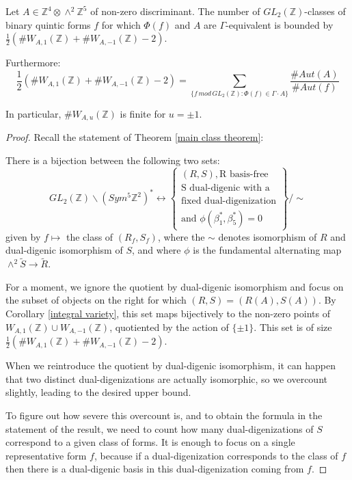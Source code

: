 \documentclass{report}
\begin{document}
\begin{corollary} \label{class count}
Let $A \in \mathbb{Z}^4 \otimes \wedge^2 \mathbb{Z}^5$ of non-zero discriminant.  The number of $GL_2(\mathbb{Z})$-classes of binary quintic forms $f$ for which $\Phi(f)$ and $A$ are $\Gamma$-equivalent is bounded by $\frac{1}{2}(\# W_{A,1}(\mathbb{Z}) + \# W_{A,-1}(\mathbb{Z}) - 2)$.

Furthermore:
\begin{equation}
\frac{1}{2}(\# W_{A,1}(\mathbb{Z}) + \# W_{A,-1}(\mathbb{Z}) - 2) = \sum_{\{f \, mod \, GL_2(\mathbb{Z}) : \Phi(f) \in \Gamma \cdot A \} } \frac{\#Aut(A)}{\#Aut(f)}
\end{equation}

In particular, $\# W_{A,u}(\mathbb{Z})$ is finite for $u = \pm 1$.
\end{corollary}
\begin{proof}
Recall the statement of Theorem \ref{main class theorem}:

There is a bijection between the following two sets:
\begin{equation}
GL_2(\mathbb{Z}) \backslash (Sym^5 \mathbb{Z}^2)^* \leftrightarrow
\left \{
\begin{array}{l}
(R,S), \text{R basis-free} \\
\text{S dual-digenic with a} \\
\text{fixed dual-digenization} \\
\text{and } \phi(\beta_1^*,\beta_5^*) = 0 
\end{array}
\right \}
 / \sim
\end{equation}
given by $f \mapsto$ the class of $(R_f, S_f)$, where the $\sim$ denotes isomorphism of $R$ and dual-digenic isomorphism of $S$, and where $\phi$ is the fundamental alternating map $\wedge^2 \tilde{S} \to \tilde{R}$.

For a moment, we ignore the quotient by dual-digenic isomorphism and focus on the subset of objects on the right for which $(R,S) = (R(A),S(A))$.  By Corollary \ref{integral variety}, this set maps bijectively to the non-zero points of $W_{A,1}(\mathbb{Z}) \cup W_{A,-1}(\mathbb{Z})$, quotiented by the action of $\{\pm 1\}$.  This set is of size $\frac{1}{2}(\# W_{A,1}(\mathbb{Z}) + \# W_{A,-1}(\mathbb{Z}) - 2)$.

When we reintroduce the quotient by dual-digenic isomorphism, it can happen that two distinct dual-digenizations are actually isomorphic, so we overcount slightly, leading to the desired upper bound.

To figure out how severe this overcount is, and to obtain the formula in the statement of the result, we need to count how many dual-digenizations of $S$ correspond to a given class of forms.  It is enough to focus on a single representative form $f$, because if a dual-digenization corresponds to the class of $f$ then there is a dual-digenic basis in this dual-digenization coming from $f$.


\end{proof}
\end{document}
